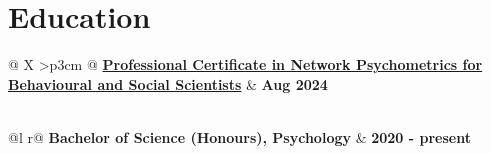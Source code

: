 \documentclass[a4paper,12pt]{article}
\begin{document}
\section{Education}

\begin{tabularx}{\linewidth}{@{} X >{\raggedleft\arraybackslash}p{3cm} @{}}
    \href{https://credentials.nus.edu.sg/ecab0868-7c14-4cae-a6a6-1f34352337eb}{\textbf{Professional Certificate in Network Psychometrics for Behavioural and \newline Social Scientists}} & \textbf{Aug 2024} \\
     \\[3.75pt]
\end{tabularx}

\begin{tabularx}{\linewidth}{ @{}l r@{} }
    \textbf{Bachelor of Science (Honours), Psychology} & \hfill \textbf{2020 - present} \\ [3.75pt]
     \\[3.75pt]
\end{tabularx}

\vfill
{}
\end{document}
